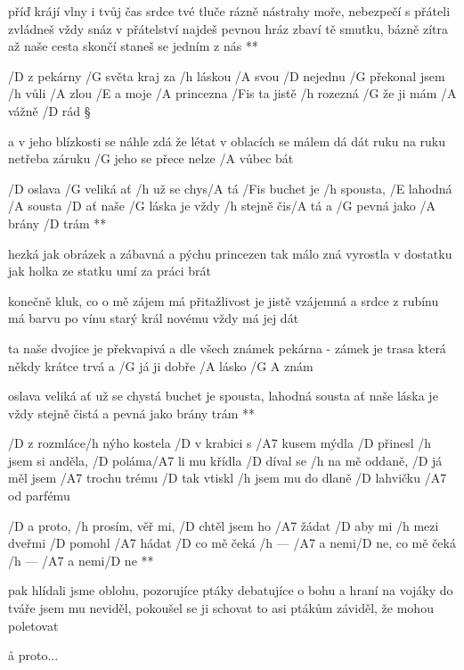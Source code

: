 \R  příď krájí vlny i tvůj čas
    srdce tvé tluče rázně
    nástrahy moře, nebezpečí
    s přáteli zvládneš vždy snáz
    v přátelství najdeš pevnou hráz
    zbaví tě smutku, bázně
    zítra až naše cesta skončí
    staneš se jedním z nás **




/D z pekárny /G světa kraj za /h láskou /A svou
/D nejednu /G překonal jsem /h vůli /A zlou
/E a moje /A princezna /Fis ta jistě /h rozezná
/G že ji mám /A vážně /D rád \S

a v jeho blízkosti se náhle zdá
že létat v oblacích se málem dá
dát ruku na ruku netřeba záruku
/G jeho se přece nelze /A vůbec bát

\R  /D oslava /G veliká ať /h už se chys/A tá
    /Fis buchet je /h spousta, /E lahodná /A sousta
    /D ať naše /G láska je vždy /h stejně čis/A tá
    a /G pevná jako /A brány /D trám **

hezká jak obrázek a zábavná
a pýchu princezen tak málo zná
vyrostla v dostatku jak holka ze statku
umí za práci brát \s

konečně kluk, co o mě zájem má
přitažlivost je jistě vzájemná
a srdce z rubínu má barvu po vínu
starý král novému vždy má jej dát

\R  ta naše dvojice je překvapivá
    a dle všech známek pekárna - zámek
    je trasa která někdy krátce trvá
    a /G já ji dobře /A lásko /{G A} znám \s

    oslava veliká ať už se chystá
    buchet je spousta, lahodná sousta
    ať naše láska je vždy stejně čistá
    a pevná jako brány trám **




/D z rozmláce/h nýho kostela /D v krabici s /A7 kusem mýdla
/D přinesl /h jsem si anděla, /D poláma/A7 li mu křídla
/D díval se /h na mě oddaně, /D já měl jsem /A7 trochu trému
/D tak vtiskl /h jsem mu do dlaně /D lahvičku /A7 od parfému

\R  /D a proto, /h prosím, věř mi, /D chtěl jsem ho /A7 žádat
    /D aby mi /h mezi dveřmi /D pomohl /A7 hádat
    /D co mě čeká /h --- /A7 a nemi/D ne, co mě čeká /h --- /A7 a nemi/D ne **

pak hlídali jsme oblohu, pozorujíce ptáky
debatujíce o bohu  a hraní  na vojáky
do tváře jsem mu neviděl, pokoušel se ji schovat
to asi ptákům záviděl, že mohou poletovat

\r a proto...

